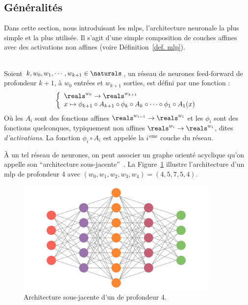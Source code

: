 \subsection{Généralités}

Dans cette section, nous introduisant les \glspl{mlp},
l'architecture neuronale la plus simple et la plus utilisée.
Il s'agit d'une simple composition de couches affines avec des activations non affines 
(voire Définition~\ref{def. mlp}).


\begin{definition}\ \\
    \label{def. mlp}
    Soient \(k, w_0, w_1, \cdots, w_{k+1}\in\naturals\), 
    un réseau de neurones feed-forward de profondeur \(k+1\), à \(w_0\) entrées et \(w_{k+1}\) sorties, 
    est défini par une fonction :
    \begin{equation}
        \label{eq. mlp}
        \left\{
        \begin{array}{l}
            \reals^{w_0} \to \reals^{w_{k+1}}\\
            x\mapsto
            \phi_{k+1} \circ A_{k+1} \circ \phi_k \circ A_k \circ \cdots \circ \phi_1 \circ A_1(x)
        \end{array}
        \right.
    \end{equation}
    Où les \(A_i\) sont des fonctions affines \(\reals^{w_{i-1}}\to\reals^{w_i}\) 
    et les \(\phi_i\) sont des fonctions quelconques, typiquement non affines
    \(\reals^{w_i}\to\reals^{w_i}\), dites \emph{d'activations}.
    La fonction \(\phi_i\circ A_i\) est appelée la \(i^{\, \mathrm{eme}}\) couche du réseau.
\end{definition}

À un tel réseau de neurones, on peut associer un graphe orienté acyclique 
qu'on appelle son ``architecture sous-jacente''~\parencite{Kearns_Vazirani_1994}. 
La Figure~\ref{fig. mlp} illustre l'architecture d'un \gls{mlp} de profondeur 4
avec \({(w_0, w_1, w_2, w_3, w_4) = (4, 5, 7, 5, 4)}\).

\begin{figure}[hbt]
    \begin{center}
        \includegraphics[width=10cm]{assets/images/mlp.png}
    \end{center}
    \caption{Architecture sous-jacente d'un  de profondeur 4.}
    \label{fig. mlp}
\end{figure}

